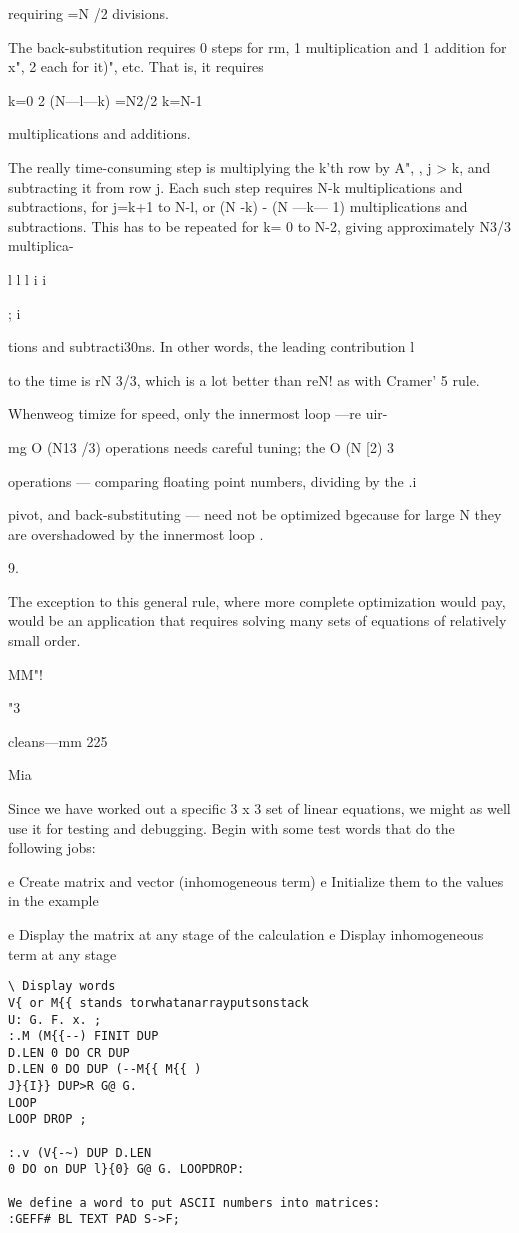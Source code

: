 {requiring =N /2 divisions.

The back-substitution requires 0 steps for rm, 1 multiplication
and 1 addition for x", 2 each for it)", etc. That is, it requires

k=0
2 (N—l—k) =N2/2
k=N-1

multiplications and additions.

The really time-consuming step is multiplying the k'th row by
A", , j > k, and subtracting it from row j. Each such step requires
N-k multiplications and subtractions, for j=k+1 to N-l, or
(N -k) - (N —k— 1) multiplications and subtractions. This has to be
repeated for k= 0 to N-2, giving approximately N3/3 multiplica-

 

l
l
l
i
i}
;
i

 

tions and subtracti30ns. In other words, the leading contribution l

to the time is rN 3/3, which is a lot better than reN! as with
Cramer' 5 rule.

Whenweog timize for speed, only the innermost loop —re uir-

mg O (N13 /3) operations needs careful tuning; the O (N [2) 3

operations — comparing floating point numbers, dividing by the .i

pivot, and back-substituting — need not be optimized bgecause for
large N they are overshadowed by the innermost loop .

 

9.

The exception to this general rule, where more complete optimization would pay, would be an
application that requires solving many sets of equations of relatively small order.

 

MM"!

"3

cleans—mm 225

Mia

Since we have worked out a specific 3 x 3 set of linear equations,
we might as well use it for testing and debugging. Begin with
some test words that do the following jobs:

e Create matrix and vector (inhomogeneous term)
e Initialize them to the values in the example

e Display the matrix at any stage of the calculation
e Display inhomogeneous term at any stage
\begin{verbatim}
\ Display words
V{ or M{{ stands torwhatanarrayputsonstack
U: G. F. x. ;
:.M (M{{--) FINIT DUP
D.LEN 0 DO CR DUP
D.LEN 0 DO DUP (--M{{ M{{ )
J}{I}} DUP>R G@ G.
LOOP
LOOP DROP ;

:.v (V{-~) DUP D.LEN
0 DO on DUP l}{0} G@ G. LOOPDROP:

We define a word to put ASCII numbers into matrices:
:GEFF# BL TEXT PAD S->F;
\end{verbatim}

